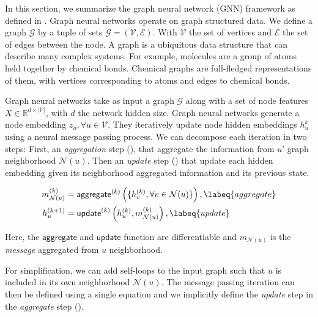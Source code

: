 In this section, we summarize the graph neural network (GNN) framework as defined in \textcite{hamilton_2020}.
Graph neural networks operate on graph structured data. We define a graph $\mathscr{G}$ by a tuple of sets $\mathscr{G} = (\mathcal{V}, \mathcal{E})$. 
With $\mathcal{V}$ the set of vertices and $\mathcal{E}$ the set of edges between the node. 
A graph is a ubiquitous data structure that can describe many complex systems. 
For example, molecules are a group of atoms held together by chemical bonds. 
Chemical graphs are full-fledged representations of them, with vertices corresponding to atoms and edges to chemical bonds.

Graph neural networks take as input a graph $\mathscr{G}$ along with a set of node features $X \in \mathbb{R}^{d \times |\mathcal{V}|}$, with $d$ the network hidden size.
Graph neural networks generate a node embedding $z_u, \forall u \in \mathcal{V}$. They iteratively update node hidden embeddings $h_u^{k}$ using a neural message passing process. 
We can decompose each iteration in two steps: First, an \textit{aggregation} step (), that aggregate the information from $u$' graph neighborhood $\mathcal{N}(u)$. 
Then an \textit{update} step () that update each hidden embedding given its neighborhood aggregated information and its previous state.

\begin{align}
    m^{(k)}_{\mathcal{N}(u)} &= \mathsf{aggregate}^{(k)}\left(\{h_v^{(k)}, \forall v \in \mathcal{N}(u)\}\right), \labeq{aggregate} \\
    h^{(k+1)}_u &= \mathsf{update}^{(k)}\left(h^{(k)}_u, m^{(k)}_{\mathcal{N}(u)}\right), \labeq{update}
\end{align}

Here, the $\mathsf{aggregate}$ and $\mathsf{update}$ function are differentiable and $m_{\mathcal{N}(u)}$ is the \textit{message} aggregated from $u$ neighborhood.

For simplification, we can add self-loops to the input graph such that $u$ is included in its own neighborhood $\mathcal{N}(u)$. 
The message passing iteration can then be defined using a single equation and we implicitly define the \textit{update} step in the \textit{aggregate} step ().

